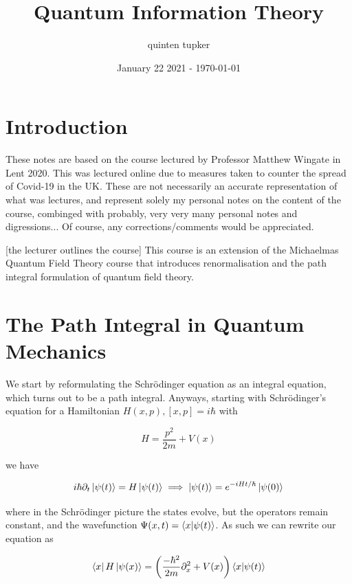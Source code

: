 \documentclass{article}
\title{Quantum Information Theory}
\author{quinten tupker}
\date{January 22 2021 - \today}
\theoremstyle{definition}
\begin{document}
\maketitle

\section*{Introduction}

These notes are based on the course lectured by Professor Matthew Wingate in
Lent 2020. 
This was lectured online due to measures taken to counter the spread of Covid-19
in the UK. These are not necessarily an accurate representation of what was
lectures, and represent solely my personal notes on the content of the course,
combinged with probably, very very many personal notes and digressions... Of
course, any corrections/comments would be appreciated.

[the lecturer outlines the course] This course is an extension of the Michaelmas
Quantum Field Theory course that introduces renormalisation and the path
integral formulation of quantum field theory.

\section*{The Path Integral in Quantum Mechanics}

We start by reformulating the Schr\"{o}dinger equation as an integral equation,
which turns out to be a path integral. Anyways, starting with Schr\"{o}dinger's
equation for a Hamiltonian $H(x, p), [x, p] = i\hbar$ with

\begin{equation}
  H = \frac{p^2}{2m} + V(x)
\end{equation}

we have

\begin{equation}
  i\hbar \partial_t \ket{\psi(t)} = H \ket{\psi(t)} \implies \ket{\psi(t)} = e^{-i H t / \hbar}
  \ket{\psi(0)}
\end{equation}

where in the Schr\"{o}dinger picture the states evolve, but the operators remain
constant, and the wavefunction $\Psi(x, t) = \bra{x} \ket{\psi(t)}$. As such we
can rewrite our equation as

\begin{equation}
  \bra{x} H \ket{\psi(x)} = \left( \frac{-\hbar^2}{2m} \partial_x^2 + V(x) \right) \bra{x} \ket{\psi(t)}
\end{equation}
\end{document}

